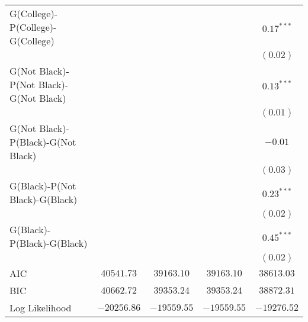 \begin{center}
\begin{longtable}{l c c c c}
G(College)-P(College)-G(College)       &               &               &               & $0.17^{***}$  \\
                                       &               &               &               & $(0.02)$      \\
G(Not Black)-P(Not Black)-G(Not Black) &               &               &               & $0.13^{***}$  \\
                                       &               &               &               & $(0.01)$      \\
G(Not Black)-P(Black)-G(Not Black)     &               &               &               & $-0.01$       \\
                                       &               &               &               & $(0.03)$      \\
G(Black)-P(Not Black)-G(Black)         &               &               &               & $0.23^{***}$  \\
                                       &               &               &               & $(0.02)$      \\
G(Black)-P(Black)-G(Black)             &               &               &               & $0.45^{***}$  \\
                                       &               &               &               & $(0.02)$      \\
\midrule
AIC                                    & $40541.73$    & $39163.10$    & $39163.10$    & $38613.03$    \\
BIC                                    & $40662.72$    & $39353.24$    & $39353.24$    & $38872.31$    \\
Log Likelihood                         & $-20256.86$   & $-19559.55$   & $-19559.55$   & $-19276.52$   \\
\end{longtable}
\end{center}
